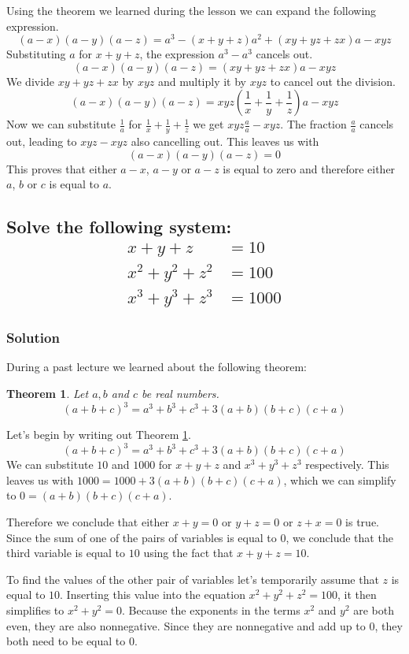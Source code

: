 \documentclass{article}
\newcommand{\solution}{\subsubsection*{\textcolor{MainColor}{Solution}}}
\newcounter{theoremcounter}
\theoremstyle{maintheorem}
\newtheorem{theorem}[theoremcounter]{\textcolor{SubColor}{Theorem}}
\begin{document}
Using the theorem we learned during the lesson we can expand the following expression.
\[(a-x)(a-y)(a-z) = a^3 - (x + y + z)a^2 + (xy + yz + zx)a - xyz\]
Substituting $a$ for $ x + y + z $, the expression $a^3 - a^3$ cancels out.
\[(a-x)(a-y)(a-z) = (xy + yz + zx)a - xyz\]
We divide $xy + yz + zx$ by $xyz$ and multiply it by $xyz$ to cancel out the division.
\[(a-x)(a-y)(a-z) = xyz\left(\frac{1}{x} + \frac{1}{y} + \frac{1}{z}\right)a - xyz\]
Now we can substitute $ \frac{1}{a} $ for $ \frac{1}{x} + \frac{1}{y} + \frac{1}{z} $ we get $ xyz\frac{a}{a} - xyz $. The fraction $ \frac{a}{a} $ cancels out, leading to $xyz - xyz$ also cancelling out.
This leaves us with
\[(a-x)(a-y)(a-z) = 0\]
This proves that either $a - x$, $a - y$ or $a - z$ is equal to zero and therefore either $a$, $b$ or $c$ is equal to $a$.

\subsection{
	\normalfont
	Solve the following system:
	\begin{align*}
		x + y + z       & = 10   \\
		x^2 + y^2 + z^2 & = 100  \\
		x^3 + y^3 + z^3 & = 1000
	\end{align*}
}

\solution

During a past lecture we learned about the following theorem:
\begin{theorem}\label{thm2}
	Let $a, b$ and $c$ be real numbers.
	\[ (a + b + c)^3 = a^3 + b^3 + c^3 + 3(a + b)(b + c)(c + a) \]
\end{theorem}

Let's begin by writing out Theorem \ref{thm2}.
\[ (a + b + c)^3 = a^3 + b^3 + c^3 + 3(a + b)(b + c)(c + a) \]
We can substitute $10$ and $1000$ for $x + y + z$ and $x^3 + y^3 + z^3$ respectively. This leaves us with $1000 = 1000 + 3(a + b)(b + c)(c + a)$,
which we can simplify to $0 = (a + b)(b + c)(c + a)$.

Therefore we conclude that either $x + y = 0$ or $y + z = 0$ or $z + x = 0$ is true.
Since the sum of one of the pairs of variables is equal to $0$, we conclude that the third variable is equal to $10$ using the fact that $x + y + z = 10$.

To find the values of the other pair of variables let's temporarily assume that $z$ is equal to $10$. Inserting this value into the equation $x^2 + y^2 + z^2 = 100$, it then simplifies to $x^2 + y^2 = 0$.
Because the exponents in the terms $x^2$ and $y^2$ are both even, they are also nonnegative. Since they are nonnegative and add up to $0$, they both need to be equal to $0$.
\end{document}
